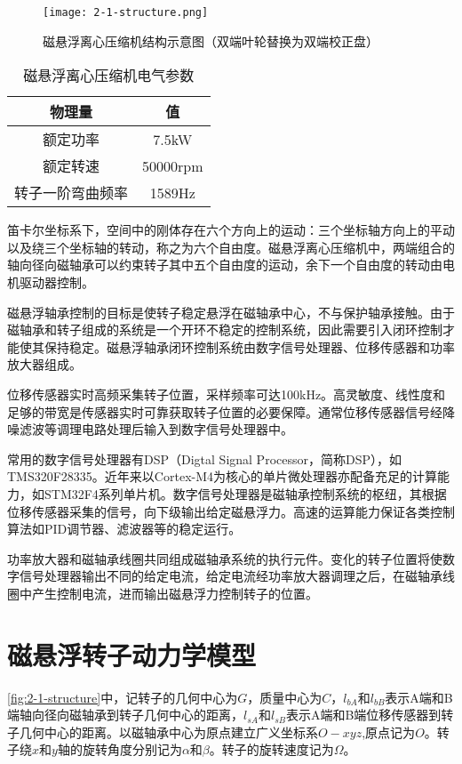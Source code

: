 \documentclass[
  lang=cn,
  degree=master,
  openany,oneside
]{nuaathesis}
\begin{document}
\begin{figure}[h!]
	\texttt{[image: 2-1-structure.png]}
	\caption{磁悬浮离心压缩机结构示意图（双端叶轮替换为双端校正盘）}
	\label{fig:2-1-structure}
\end{figure}

\begin{table}[h!]
  \caption[磁悬浮离心压缩机电气参数]{磁悬浮离心压缩机电气参数\label{tab:motor_para}}
  \begin{tabular}{cc}
    \toprule
    物理量 & 值 \\
    \midrule
    额定功率 & 7.5kW\\
    额定转速 & 50000rpm\\
    转子一阶弯曲频率 & 1589Hz\\
    \bottomrule
  \end{tabular}
\end{table}

笛卡尔坐标系下，空间中的刚体存在六个方向上的运动：三个坐标轴方向上的平动以及绕三个坐标轴的转动，称之为六个自由度。磁悬浮离心压缩机中，两端组合的轴向径向磁轴承可以约束转子其中五个自由度的运动，余下一个自由度的转动由电机驱动器控制。

磁悬浮轴承控制的目标是使转子稳定悬浮在磁轴承中心，不与保护轴承接触。由于磁轴承和转子组成的系统是一个开环不稳定的控制系统，因此需要引入闭环控制才能使其保持稳定。磁悬浮轴承闭环控制系统由数字信号处理器、位移传感器和功率放大器组成。

位移传感器实时高频采集转子位置，采样频率可达100kHz。高灵敏度、线性度和足够的带宽是传感器实时可靠获取转子位置的必要保障。通常位移传感器信号经降噪滤波等调理电路处理后输入到数字信号处理器中。

常用的数字信号处理器有DSP（Digtal Signal Processor，简称DSP），如TMS320F28335。近年来以Cortex-M4为核心的单片微处理器亦配备充足的计算能力，如STM32F4系列单片机。数字信号处理器是磁轴承控制系统的枢纽，其根据位移传感器采集的信号，向下级输出给定磁悬浮力。高速的运算能力保证各类控制算法如PID调节器、滤波器等的稳定运行。

功率放大器和磁轴承线圈共同组成磁轴承系统的执行元件。变化的转子位置将使数字信号处理器输出不同的给定电流，给定电流经功率放大器调理之后，在磁轴承线圈中产生控制电流，进而输出磁悬浮力控制转子的位置。

\section{磁悬浮转子动力学模型}
\autoref{fig:2-1-structure}中，记转子的几何中心为$ G $，质量中心为$ C $，$ l_{bA} $和$ l_{bB} $表示A端和B端轴向径向磁轴承到转子几何中心的距离，$ l_{sA} $和$ l_{sB} $表示A端和B端位移传感器到转子几何中心的距离。以磁轴承中心为原点建立广义坐标系$ O-xyz $,原点记为$ O $。转子绕$ x $和$ y $轴的旋转角度分别记为$ \alpha $和$ \beta $。转子的旋转速度记为$ \Omega $。
\end{document}
